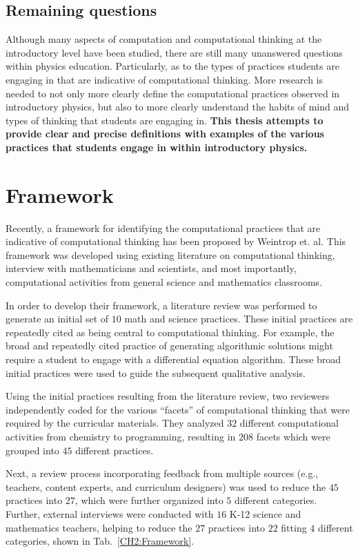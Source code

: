 \documentclass{msuphddissertation}
\begin{document}
\begin{doublespace}
\subsection{Remaining questions}

Although many aspects of computation and computational thinking at the introductory level have been studied, there are still many unanswered questions within physics education.  Particularly, as to the types of practices students are engaging in that are indicative of computational thinking.  More research is needed to not only more clearly define the computational practices observed in introductory physics, but also to more clearly understand the habits of mind and types of thinking that students are engaging in.  \textbf{This thesis attempts to provide clear and precise definitions with examples of the various practices that students engage in within introductory physics.}

\section{Framework}

Recently, a framework for identifying the computational practices that are indicative of computational thinking has been proposed by Weintrop et. al.  This framework was developed using existing literature on computational thinking, interview with mathematicians and scientists, and most importantly, computational activities from general science and mathematics classrooms.

In order to develop their framework, a literature review was performed to generate an initial set of $10$ math and science practices.  These initial practices are repeatedly cited as being central to computational thinking.  For example, the broad and repeatedly cited practice of generating algorithmic solutions might require a student to engage with a differential equation algorithm.  These broad initial practices were used to guide the subsequent qualitative analysis.

Using the initial practices resulting from the literature review, two reviewers independently coded for the various ``facets'' of computational thinking that were required by the curricular materials.  They analyzed $32$ different computational activities from chemistry to programming, resulting in $208$ facets which were grouped into $45$ different practices.

Next, a review process incorporating feedback from multiple sources (e.g., teachers, content experts, and curriculum designers) was used to reduce the $45$ practices into $27$, which were further organized into $5$ different categories.  Further, external interviews were conducted with $16$ K-12 science and mathematics teachers, helping to reduce the $27$ practices into $22$ fitting $4$ different categories, shown in Tab.~\ref{CH2:Framework}.


\end{doublespace}
\end{document}
